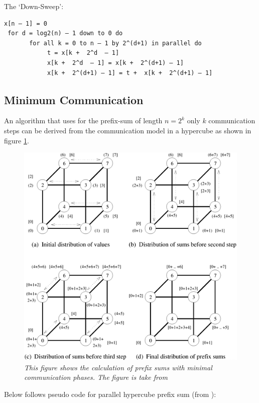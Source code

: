 \documentclass[a4paper,11pt,twoside]{article}
\begin{document}
The `Down-Sweep':
\begin{verbatim}
x[n – 1] = 0
 for d = log2(n) – 1 down to 0 do 
       for all k = 0 to n – 1 by 2^(d+1) in parallel do 
            t = x[k +  2^d  – 1]
            x[k +  2^d  – 1] = x[k +  2^(d+1) – 1]
            x[k +  2^(d+1) – 1] = t +  x[k +  2^(d+1) – 1]

\end{verbatim}

\subsection*{Minimum Communication}
An algorithm that uses for the prefix-sum of length $n = 2^k$ only $k$ communication steps can be derived from the communication model in a hypercube as shown in figure \ref{fig:hypercube}.

\begin{figure}

  \centering
    \includegraphics[width=1\textwidth]{hypercube.png}
    \caption{\textit{This figure shows the calculation of prefix sums with minimal communication phases. The figure is take from \cite[chap 4.3]{grama2003}}}
    \label{fig:hypercube}
\end{figure}

Below follows pseudo code for parallel hypercube prefix sum (from \cite{grama2003}):
\end{document}
